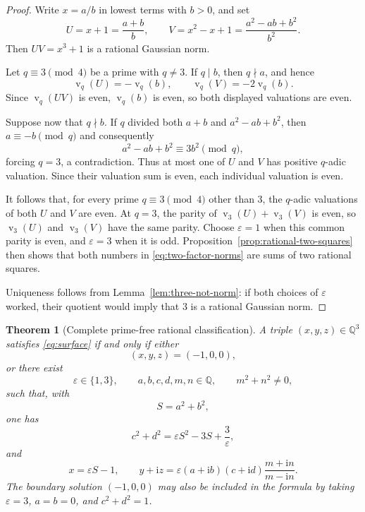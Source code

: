 \documentclass[11pt,a4paper]{article}
\numberwithin{equation}{section}
\newtheorem{theorem}{Theorem}[section]
\theoremstyle{definition}
\newcommand{\Q}{\mathbb Q}
\newcommand{\ii}{\mathrm i}
\newcommand{\vord}{\operatorname v}
\begin{document}
\begin{proof}
Write $x=a/b$ in lowest terms with $b>0$, and set
\[
 U=x+1=\frac{a+b}{b},
 \qquad
 V=x^2-x+1=\frac{a^2-ab+b^2}{b^2}.
\]
Then $UV=x^3+1$ is a rational Gaussian norm.

Let $q\equiv3\pmod4$ be a prime with $q\ne3$.  If $q\mid b$, then
$q\nmid a$, and hence
\[
 \vord_q(U)=-\vord_q(b),
 \qquad
 \vord_q(V)=-2\vord_q(b).
\]
Since $\vord_q(UV)$ is even, $\vord_q(b)$ is even, so both displayed
valuations are even.

Suppose now that $q\nmid b$.  If $q$ divided both $a+b$ and
$a^2-ab+b^2$, then $a\equiv-b\pmod q$ and consequently
\[
 a^2-ab+b^2\equiv3b^2\pmod q,
\]
forcing $q=3$, a contradiction.  Thus at most one of $U$ and $V$ has
positive $q$-adic valuation.  Since their valuation sum is even, each
individual valuation is even.

It follows that, for every prime $q\equiv3\pmod4$ other than $3$, the
$q$-adic valuations of both $U$ and $V$ are even.  At $q=3$, the parity of
$\vord_3(U)+\vord_3(V)$ is even, so $\vord_3(U)$ and $\vord_3(V)$ have the
same parity.  Choose $\varepsilon=1$ when this common parity is even, and
$\varepsilon=3$ when it is odd.  Proposition~\ref{prop:rational-two-squares}
then shows that both numbers in \eqref{eq:two-factor-norms} are sums of two
rational squares.

Uniqueness follows from Lemma~\ref{lem:three-not-norm}: if both choices of
$\varepsilon$ worked, their quotient would imply that $3$ is a rational
Gaussian norm.
\end{proof}

\begin{theorem}[Complete prime-free rational classification]
\label{thm:prime-free-classification}
A triple $(x,y,z)\in\Q^3$ satisfies \eqref{eq:surface} if and only if either
\[
 (x,y,z)=(-1,0,0),
\]
or there exist
\[
 \varepsilon\in\{1,3\},
 \qquad
 a,b,c,d,m,n\in\Q,
 \qquad
 m^2+n^2\ne0,
\]
such that, with
\begin{equation}
 S=a^2+b^2,
 \label{eq:def-S}
\end{equation}
one has
\begin{equation}
 c^2+d^2
 =\varepsilon S^2-3S+\frac{3}{\varepsilon},
 \label{eq:single-residual-norm-equation}
\end{equation}
and
\begin{equation}
 \boxed{
 x=\varepsilon S-1,
 \qquad
 y+\ii z=
 \varepsilon(a+\ii b)(c+\ii d)
 \frac{m+\ii n}{m-\ii n}.
 }
 \label{eq:prime-free-gaussian-formula}
\end{equation}
The boundary solution $(-1,0,0)$ may also be included in the formula by
taking $\varepsilon=3$, $a=b=0$, and $c^2+d^2=1$.
\end{theorem}
\end{document}
